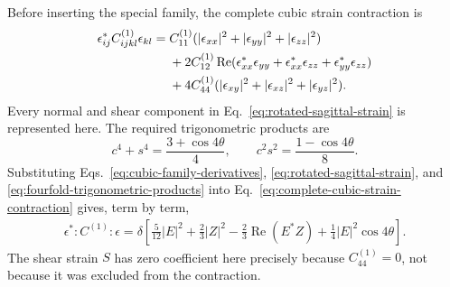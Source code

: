 Before inserting the special family, the complete cubic strain contraction
is
\begin{align}
  \epsilon_{ij}^*C^{(1)}_{ijkl}\epsilon_{kl}
  ={}&C_{11}^{(1)}
      (|\epsilon_{xx}|^2+|\epsilon_{yy}|^2+|\epsilon_{zz}|^2)       \notag\\
    &+2C_{12}^{(1)}\operatorname{Re}
      (\epsilon_{xx}^*\epsilon_{yy}
       +\epsilon_{xx}^*\epsilon_{zz}
       +\epsilon_{yy}^*\epsilon_{zz})                              \notag\\
    &+4C_{44}^{(1)}
      (|\epsilon_{xy}|^2+|\epsilon_{xz}|^2+|\epsilon_{yz}|^2).
  \label{eq:complete-cubic-strain-contraction}
\end{align}
Every normal and shear component in
Eq.~\eqref{eq:rotated-sagittal-strain} is represented here.  The required
trigonometric products are
\begin{equation}
  c^4+s^4=\frac{3+\cos4\theta}{4},
  \qquad
  c^2s^2=\frac{1-\cos4\theta}{8}.
  \label{eq:fourfold-trigonometric-products}
\end{equation}
Substituting Eqs.~\eqref{eq:cubic-family-derivatives},
\eqref{eq:rotated-sagittal-strain}, and
\eqref{eq:fourfold-trigonometric-products} into
Eq.~\eqref{eq:complete-cubic-strain-contraction} gives, term by term,
\begin{align}
  \epsilon^*:C^{(1)}:\epsilon
  =\delta\left[
      \frac{5}{12}|E|^2
      +\frac{2}{3}|Z|^2
      -\frac{2}{3}\operatorname{Re}(E^*Z)
      +\frac{1}{4}|E|^2\cos4\theta
    \right].
  \label{eq:registered-cubic-strain-contraction}
\end{align}
The shear strain \(S\) has zero coefficient here precisely because
\(C_{44}^{(1)}=0\), not because it was excluded from the contraction.

